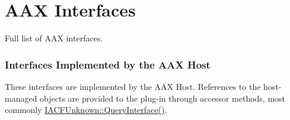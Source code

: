 \hypertarget{a00003}{}\section{A\+A\+X Interfaces}
\label{a00003}
Full list of A\+A\+X interfaces. 

\hypertarget{aax_host_implementation}{}\subsubsection{Interfaces Implemented by the A\+A\+X Host}\label{aax_host_implementation}
These interfaces are implemented by the A\+A\+X Host. References to the host-\/managed objects are provided to the plug-\/in through accessor methods, most commonly \hyperlink{a00146_a8b7f0ae9c78d007ca76aa462ebe53135}{I\+A\+C\+F\+Unknown\+::\+Query\+Interface()}.


